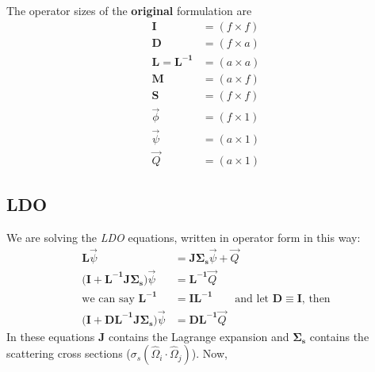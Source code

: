 \documentclass[12pt,twoside]{article}
\newcommand{\ve}[1]{\ensuremath{\mathbf{#1}}}
\begin{document}
\vspace*{1 em}
The operator sizes of the \textbf{original} formulation are
\begin{align*}
\ve{I} &= (f \times f) \\
\ve{D} &= (f \times a) \\
\ve{L} = \ve{L^{-1}} &= (a \times a) \\
\ve{M} &= (a \times f) \\
\ve{S} &= (f \times f) \\
\vec{\phi} &= (f \times 1) \\
\vec{\psi} &= (a \times 1) \\
\vec{Q} &= (a \times 1)
\end{align*}


\subsection*{LDO}
We are solving the \textit{LDO} equations, written in operator form in this way:
%
\begin{align}
\ve{L}\vec{\psi} &= \ve{J \Sigma_s}\vec{\psi} + \vec{Q}\\
\bigl(\ve{I} + \ve{L^{-1} J \Sigma_s}\bigr)\vec{\psi} &= \ve{L^{-1}}\vec{Q} \nonumber \\ 
\text{we can say }\ve{L^{-1}} &= \ve{I}\ve{L^{-1}} \qquad \text{and let } \ve{D} \equiv \ve{I} \text{, then} \nonumber\\
\bigl(\ve{I} + \ve{D L^{-1} J \Sigma_s}\bigr)\vec{\psi} &= \ve{D L^{-1}}\vec{Q}
\end{align}
% 
In these equations $\ve{J}$ contains the Lagrange expansion and $\ve{\Sigma_s}$ contains the scattering cross sections ($\sigma_s(\hat{\Omega}_i \cdot \hat{\Omega}_j)$).
%
Now, 
\end{document}
